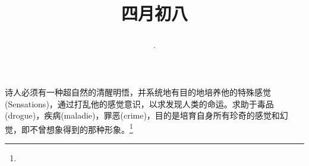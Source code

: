 \title{\date[d=15,m=5,y=2024][year:cn-y,年,month:cn,day:cn,日,·,weekday]·四月初八 }
诗人必须有一种超自然的清醒明悟，并系统地有目的地培养他的特殊感觉(Sensations)，通过打乱他的感觉意识，以求发现人类的命运。求助于毒品(drogue)，疾病(maladie)，罪恶(crime)，目的是培育自身所有珍奇的感觉和幻觉，即不曾想象得到的那种形象。\footnote{ }

